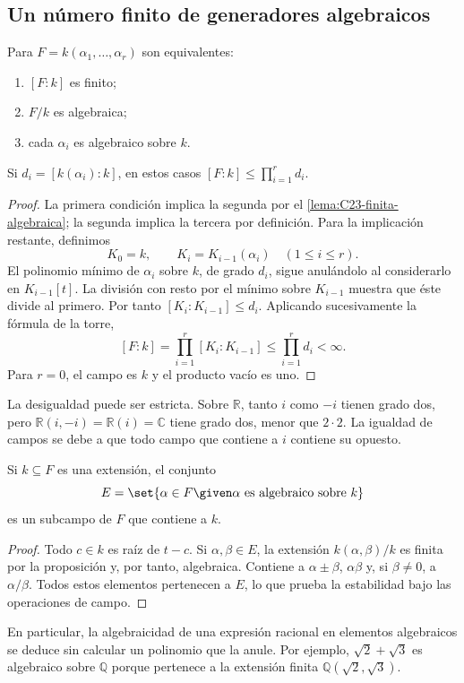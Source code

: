 \subsection{Un número finito de generadores algebraicos}
\begin{prop}\label{prop:C23-generada-algebraica}
Para $F=k(\alpha_1,\ldots,\alpha_r)$ son equivalentes:
\begin{enumerate}[nosep]
\item $[F:k]$ es finito;
\item $F/k$ es algebraica;
\item cada $\alpha_i$ es algebraico sobre $k$.
\end{enumerate}
Si $d_i=[k(\alpha_i):k]$, en estos casos $[F:k]\leq\prod_{i=1}^r d_i$.
\end{prop}
\begin{proof}
La primera condición implica la segunda por el \cref{lema:C23-finita-algebraica}; la segunda implica la tercera por definición. Para la implicación restante, definimos
\[
K_0=k,\qquad K_i=K_{i-1}(\alpha_i)\quad(1\leq i\leq r).
\]
El polinomio mínimo de $\alpha_i$ sobre $k$, de grado $d_i$, sigue anulándolo al considerarlo en $K_{i-1}[t]$. La división con resto por el mínimo sobre $K_{i-1}$ muestra que éste divide al primero. Por tanto $[K_i:K_{i-1}]\leq d_i$. Aplicando sucesivamente la fórmula de la torre,
\[
[F:k]=\prod_{i=1}^r[K_i:K_{i-1}]\leq\prod_{i=1}^r d_i<\infty.
\]
Para $r=0$, el campo es $k$ y el producto vacío es uno.
\end{proof}

\begin{obs}
La desigualdad puede ser estricta. Sobre $\mathbb R$, tanto $i$ como $-i$ tienen grado dos, pero $\mathbb R(i,-i)=\mathbb R(i)=\mathbb C$ tiene grado dos, menor que $2\cdot2$. La igualdad de campos se debe a que todo campo que contiene a $i$ contiene su opuesto.
\end{obs}

\begin{coro}\label{coro:C23-campo-algebraicos}
Si $k\subseteq F$ es una extensión, el conjunto
\[
E=\set{\alpha\in F\given \alpha\text{ es algebraico sobre }k}
\]
es un subcampo de $F$ que contiene a $k$.
\end{coro}
\begin{proof}
Todo $c\in k$ es raíz de $t-c$. Si $\alpha,\beta\in E$, la extensión $k(\alpha,\beta)/k$ es finita por la proposición y, por tanto, algebraica. Contiene a $\alpha\pm\beta$, $\alpha\beta$ y, si $\beta\ne0$, a $\alpha/\beta$. Todos estos elementos pertenecen a $E$, lo que prueba la estabilidad bajo las operaciones de campo.
\end{proof}
En particular, la algebraicidad de una expresión racional en elementos algebraicos se deduce sin calcular un polinomio que la anule. Por ejemplo, $\sqrt2+\sqrt3$ es algebraico sobre $\mathbb Q$ porque pertenece a la extensión finita $\mathbb Q(\sqrt2,\sqrt3)$.


